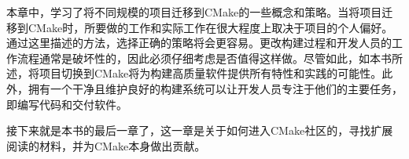 
本章中，学习了将不同规模的项目迁移到CMake的一些概念和策略。当将项目迁移到CMake时，所要做的工作和实际工作在很大程度上取决于项目的个人偏好。通过这里描述的方法，选择正确的策略将会更容易。更改构建过程和开发人员的工作流程通常是破坏性的，因此必须仔细考虑是否值得这样做。尽管如此，如本书所述，将项目切换到CMake将为构建高质量软件提供所有特性和实践的可能性。此外，拥有一个干净且维护良好的构建系统可以让开发人员专注于他们的主要任务，即编写代码和交付软件。

接下来就是本书的最后一章了，这一章是关于如何进入CMake社区的，寻找扩展阅读的材料，并为CMake本身做出贡献。